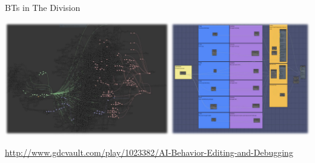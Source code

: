 \begin{frame}{BTs in The Division}
	\begin{center}
		\includegraphics[width=\textwidth]{the_division}
		
		\url{http://www.gdcvault.com/play/1023382/AI-Behavior-Editing-and-Debugging}
	\end{center}
\end{frame}
